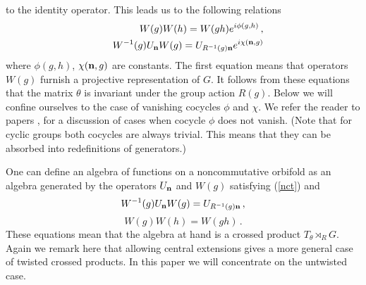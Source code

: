 \documentclass[a4paper,a4paper]{article}
\begin{document}
to the identity operator. This leads us to the following relations  
\begin{eqnarray}
&&W(g)W(h) = W(gh) e^{i\phi(g,h)} \, , \nonumber\\ 
&& W^{-1}(g)U_{\bf n}W(g) = U_{R^{-1}(g){\bf n}} e^{i \chi({\bf n},g)}
\end{eqnarray}
where $\phi(g,h)$, $\chi({\bf n},g)$ are constants.
The first equation means that operators $W(g)$ furnish a projective representation of $G$. 
It follows from these equations that the matrix $\theta$ is  invariant under the group action $R(g)$.  
Below we will confine ourselves to the case  of vanishing  cocycles $\phi$ and $\chi$. We refer the reader to 
papers \cite{HoWu}, \cite{Doug_discr} for a discussion of cases when  cocycle $\phi$ does not vanish. 
(Note that for cyclic groups both cocycles are always trivial. This means that they can be absorbed into 
redefinitions of generators.)      


One can define an algebra of functions on a  noncommutative orbifold as an algebra generated by 
the operators $U_{\bf n}$ and  $W(g)$ satisfying  (\ref{nct}) and 
\begin{equation} \label{WU}
 W^{-1}(g)U_{\bf n}W(g) = U_{R^{-1}(g){\bf n}} \, , 
\end{equation}
\begin{equation}
  W(g)W(h) = W(gh) \, .
\end{equation}
These equations  mean that the algebra at hand is a crossed product 
$T_{\theta}\rtimes_{R} G$. Again we remark here that allowing central extensions gives a more general case of 
twisted crossed products. In this paper we will concentrate on the untwisted case.
\end{document}
